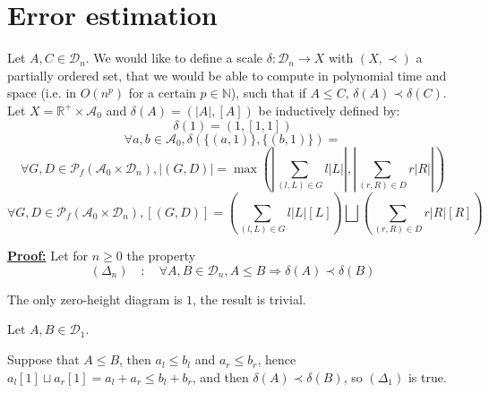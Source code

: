 \section{Error estimation}

Let $A, C \in \mathcal{D}_n$. We would like to define a scale $\delta : \mathcal{D}_n \rightarrow X$ with $(X, \prec)$ a partially ordered set, that we would be able to compute in polynomial time and space (i.e. in $O(n^p)$ for a certain $p \in \mathbb{N}$), such that if $A \le C$, $\delta(A) \prec \delta(C)$. Let $X = \mathbb{R}^+ \times \mathcal{A}_0$ and $\delta(A) = (|A|, [A])$ be inductively defined by:
$$\delta(\boxed{1}) = (1, [1, 1])$$
$$\forall a, b \in \mathcal{A}_0, \delta(\{(a, \boxed{1})\}, \{(b, \boxed{1})\}) = $$
$$\forall G, D \in \mathscr{P}_f(\mathcal{A}_0 \times \mathcal{D}_n), |(G, D)|
= \max\left( \left|\sum_{(l, L) \in G} l |L| \right|, \left|\sum_{(r, R) \in D} r |R| \right|\right)$$
$$\forall G, D \in \mathscr{P}_f(\mathcal{A}_0 \times \mathcal{D}_n), [(G, D)]
= \left(\sum_{(l, L) \in G} l |L| [L] \right) \bigsqcup \left(\sum_{(r, R) \in D} r |R| [R]\right)$$

\noindent\underline{\textbf{Proof:}} Let for $n \ge 0$ the property
$$(\Delta_n)\quad : \quad \forall A, B \in \mathcal{D}_n, A \le B \Rightarrow \delta(A) \prec \delta(B)$$

\noindent{} The only zero-height diagram is $\boxed{1}$, the result is trivial.

\noindent{} Let $A, B \in \mathcal{D}_1$.

\begin{center}
\end{center}

Suppose that $A \le B$, then $a_l \le b_l$ and $a_r \le b_r$, hence $a_l [\boxed{1}] \sqcup a_r [\boxed{1}] = a_l + a_r \le b_l + b_r$, and then $\delta(A) \prec \delta(B)$, so $(\Delta_1)$ is true.

